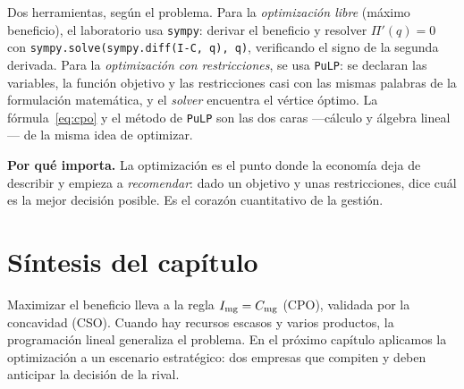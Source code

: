\begin{labbox}
Dos herramientas, según el problema. Para la \emph{optimización libre} (máximo beneficio), el laboratorio usa \texttt{sympy}: derivar el beneficio y resolver $\Pi'(q)=0$ con \texttt{sympy.solve(sympy.diff(I-C, q), q)}, verificando el signo de la segunda derivada. Para la \emph{optimización con restricciones}, se usa \texttt{PuLP}: se declaran las variables, la función objetivo y las restricciones casi con las mismas palabras de la formulación matemática, y el \emph{solver} encuentra el vértice óptimo. La fórmula~\eqref{eq:cpo} y el método de \texttt{PuLP} son las dos caras —cálculo y álgebra lineal— de la misma idea de optimizar.
\end{labbox}

\begin{ideabox}
\textbf{Por qué importa.} La optimización es el punto donde la economía deja de describir y empieza a \emph{recomendar}: dado un objetivo y unas restricciones, dice cuál es la mejor decisión posible. Es el corazón cuantitativo de la gestión.
\end{ideabox}

\section{Síntesis del capítulo}

Maximizar el beneficio lleva a la regla $I_{\mathrm{mg}}=C_{\mathrm{mg}}$ (CPO), validada por la concavidad (CSO). Cuando hay recursos escasos y varios productos, la programación lineal generaliza el problema. En el próximo capítulo aplicamos la optimización a un escenario estratégico: dos empresas que compiten y deben anticipar la decisión de la rival.
